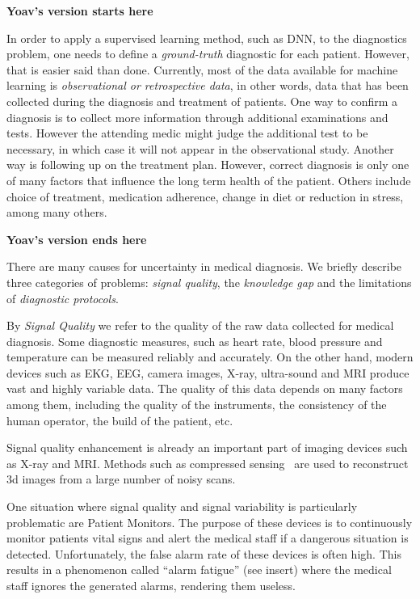 \documentclass[11pt]{pnas-new}
\begin{document}
{\bf Yoav's version starts here}


In order to apply a supervised learning method, such as  DNN, to the
diagnostics problem, one needs to define a {\em ground-truth} diagnostic for each
patient. However, that is easier said than done. Currently, most of
the data available for machine learning is {\em observational or
retrospective data}, in other words, data that has been collected
during the diagnosis and treatment of patients.
One way to confirm a diagnosis is to collect more information through
additional examinations and tests. However the attending medic might
judge the additional test to be necessary, in which case it will not
appear in the observational study.
Another way is following up on the treatment plan. However, correct
diagnosis is only one of many factors that influence the long term
health of the patient. Others include choice of treatment, medication
adherence, change in diet or reduction in stress, among many others.

{\bf Yoav's version ends here}

There are many causes for uncertainty in medical diagnosis. We briefly
describe three categories of problems: {\em signal quality}, the {\em
  knowledge gap} and the limitations of {\em diagnostic protocols}.

By {\em Signal Quality} we refer to the quality of the raw data
collected for medical diagnosis. Some diagnostic measures, such
as heart rate, blood pressure and temperature can be measured reliably
and accurately. On the other hand, modern
devices such as EKG, EEG, camera images, X-ray, ultra-sound and MRI
produce vast and highly variable data. The quality of this data
depends on many factors among them, including the quality of the instruments, the
consistency of the human operator, the build of the patient, etc.

 Signal quality enhancement is already an
important part of imaging devices such as X-ray and MRI. Methods such
as compressed sensing~\cite{lustig2008compressed} are used to
reconstruct 3d images from a large number of noisy scans.


  One situation where signal quality and signal variability is
particularly problematic are Patient Monitors. The purpose of these
devices is to continuously monitor patients vital signs and alert the
medical staff if a dangerous situation is detected. Unfortunately, the
false alarm rate of these devices is often high. This results in a
phenomenon called ``alarm fatigue'' (see insert) where the medical staff ignores
the generated alarms, rendering them useless.
\end{document}
